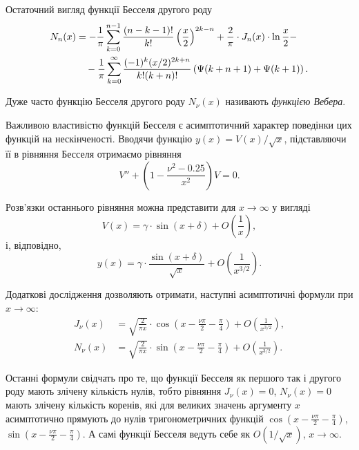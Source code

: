 Остаточний вигляд функції Бесселя другого роду
\begin{equation}
	\begin{aligned}
		N_n(x) &= -\frac{1}{\pi} \displaystyle\sum\limits_{k = 0}^{n - 1} \frac{(n - k - 1)!}{k!} \left(\frac{x}{2}\right)^{2 k - n} + \frac{2}{\pi} \cdot J_n(x) \cdot \ln \frac{x}{2} - \\
		& \quad - \frac{1}{\pi} \displaystyle\sum\limits_{k = 0}^\infty \frac{(-1)^k (x / 2)^{2 k + n}}{k! (k + n)!} \left( \Psi(k + n + 1) + \Psi(k + 1) \right).
	\end{aligned}
\end{equation}

\begin{remark}
	Дуже часто функцію Бесселя другого роду $N_\nu(x)$ називають \textit{функцією Вебера}.
\end{remark}

Важливою властивістю функцій Бесселя є асимптотичний характер поведінки цих функцій на нескінченості. Вводячи функцію $y(x) = V(x) / \sqrt{x}$, підставляючи її в рівняння Бесселя отримаємо рівняння  
\begin{equation}
	V'' + \left( 1 - \frac{\nu^2 - 0.25}{x^2} \right) V = 0.
\end{equation}

Розв'язки останнього рівняння можна представити для $x \to \infty $ у вигляді 
\begin{equation}
	V(x) = \gamma \cdot \sin(x + \delta) + O\left(\frac{1}{x}\right),
\end{equation}
і, відповідно,
\begin{equation}
	y(x) = \gamma \cdot \frac{\sin(x + \delta)}{\sqrt{x}} + O\left(\frac{1}{x^{3/2}}\right).
\end{equation}

Додаткові дослідження дозволяють отримати, наступні асимптотичні формули при $x \to \infty$:
\begin{align}
	\label{eq:4.7.14}
	J_\nu(x) &= \sqrt{\frac{2}{\pi x}} \cdot \cos \left( x - \frac{\nu \pi}{2} - \frac{\pi}{4} \right) + O\left(\frac{1}{x^{3/2}}\right), \\
	\label{eq:4.7.14'}
	N_\nu(x) &= \sqrt{\frac{2}{\pi x}} \cdot \sin \left( x - \frac{\nu \pi}{2} - \frac{\pi}{4} \right) + O\left(\frac{1}{x^{3/2}}\right).
\end{align}

Останні формули свідчать про те, що функції Бесселя як першого так і другого роду мають злічену кількість нулів, тобто рівняння $J_\nu(x) = 0$, $N_\nu(x) = 0$  мають злічену кількість коренів, які для великих значень аргументу $x$ асимптотично прямують до нулів тригонометричних функцій $\cos \left( x - \frac{\nu \pi}{2} - \frac{\pi}{4} \right)$, $\sin \left( x - \frac{\nu \pi}{2} - \frac{\pi}{4} \right)$. А самі функції Бесселя ведуть себе як $O(1/\sqrt{x})$, $x \to \infty$. \medskip

